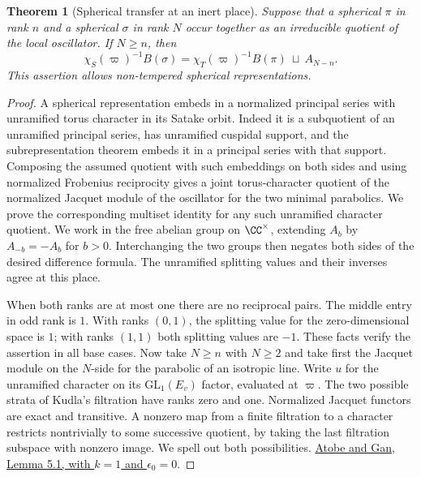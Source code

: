 \documentclass[a4paper,11pt]{article}
\newtheorem{theorem}[proposition]{Theorem}
\theoremstyle{definition}
\theoremstyle{remark}
\numberwithin{equation}{section}
\begin{document}
\begin{theorem}[Spherical transfer at an inert place]
\leavevmode\label{thm:inert175}
Suppose that a spherical \(\pi\) in rank \(n\) and a
spherical \(\sigma\) in rank \(N\) occur together as an
irreducible quotient of the local oscillator. If \(N\ge n\),
then
\begin{equation}
    \chi_S(\varpi)^{-1} B(\sigma)
       =\chi_T(\varpi)^{-1}B(\pi)\ \sqcup\ A_{N-n}.
                                                       \label{eq:inert175}
\end{equation}
This assertion allows non-tempered spherical representations.
\end{theorem}
\begin{proof}
A spherical representation embeds in a normalized principal
series with unramified torus character in its Satake orbit.
Indeed it is a subquotient of an unramified principal series,
has unramified cuspidal support, and the subrepresentation
theorem embeds it in a principal series with that support.
Composing the assumed quotient with such embeddings on both
sides and using normalized Frobenius reciprocity gives a
joint torus-character quotient of the normalized Jacquet
module of the oscillator for the two minimal parabolics.
We prove the corresponding multiset identity for any such
unramified character quotient. We work in the free abelian
group on \(\CC^\times\), extending \(A_b\) by
\(A_{-b}=-A_b\) for \(b>0\). Interchanging the two groups
then negates both sides of the desired difference formula.
The unramified splitting values and their inverses agree
at this place.

When both ranks are at most one there are no reciprocal
pairs. The middle entry in odd rank is \(1\). With ranks
\((0,1)\), the splitting value for the zero-dimensional
space is \(1\); with ranks \((1,1)\) both splitting values
are \(-1\). These facts verify the assertion in all base
cases. Now take \(N\ge n\) with \(N\ge2\) and take first
the Jacquet module on the \(N\)-side for the parabolic of
an isotropic line. Write \(u\) for the unramified character
on its \(\mathrm{GL}_1(E_v)\) factor, evaluated at \(\varpi\).
The two possible strata of Kudla's filtration have ranks
zero and one. Normalized Jacquet functors are exact and
transitive. A nonzero map from a finite filtration to a
character restricts nontrivially to some successive quotient,
by taking the last filtration subspace with nonzero image.
We spell out both possibilities.
\href{https://arxiv.org/pdf/1602.01299}{Atobe and Gan, Lemma 5.1,
with \(k=1\) and \(\epsilon_0=0\)}.


\end{proof}
\end{document}
